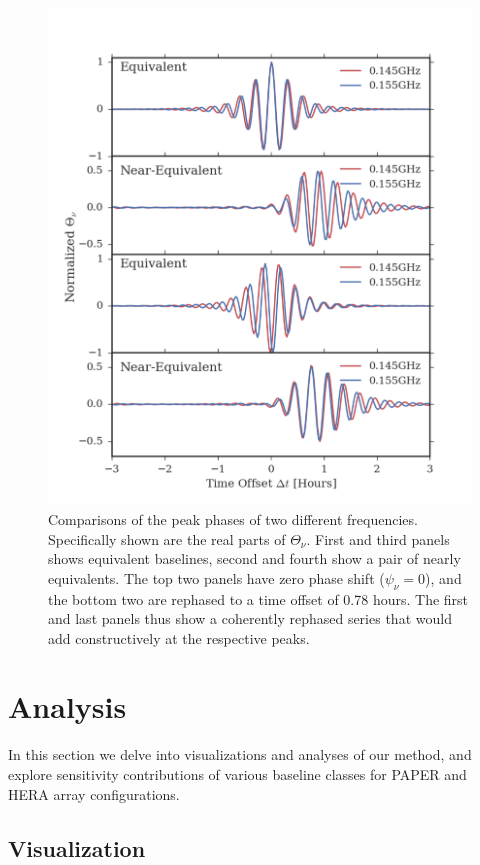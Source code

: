 \documentclass[twocolumn,apj,numberedappendix]{emulateapj}
\renewcommand\[{\begin{equation}}
\renewcommand\]{\end{equation}}
\begin{document}
\begin{figure}[H]
\includegraphics[width=1.1\linewidth]{rephs_rb}

\caption{Comparisons of the peak phases of two different frequencies. Specifically shown are the real parts of $\Theta_{\nu}$. First and third panels shows equivalent baselines, second and fourth show a pair of nearly equivalents. The top two panels have zero phase shift ($\psi_{\nu}=0$), and the bottom two are rephased to a time offset of 0.78 hours. The first and last panels thus show a coherently rephased series that would add constructively at the respective peaks. }
\label{fig:freqdiff}
\end{figure}

\section{Analysis}

In this section we delve into visualizations and analyses of our method, and explore sensitivity contributions of various baseline classes for PAPER and HERA array configurations. 
\subsection{Visualization \label{sec:visual}}
\end{document}
